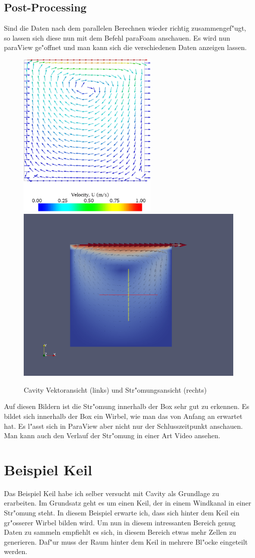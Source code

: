 \begin{refsection}
\subsection{Post-Processing}
Sind die Daten nach dem parallelen Berechnen wieder richtig
zusammengef"ugt, so lassen sich diese nun mit dem Befehl paraFoam
anschauen. Es wird nun paraView ge"offnet und man kann sich die
verschiedenen Daten anzeigen lassen.
\begin{figure}
\begin{center}
\includegraphics[width = 0.31\hsize]{./openfoam/pics/stroemung.png}
\qquad
\includegraphics[width = 0.48\hsize]{./openfoam/pics/stroemung2.png}
\end{center}
\caption{Cavity Vektoransicht (links) und Str"omungsansicht (rechts)
\cite{of}}
\end{figure}

Auf diesen Bildern ist die Str"omung innerhalb der Box sehr gut zu
erkennen. Es bildet sich innerhalb der Box ein Wirbel, wie man das von
Anfang an erwartet hat. Es l"asst sich in ParaView aber nicht nur der
Schlusszeitpunkt anschauen. Man kann auch den Verlauf der Str"omung in
einer Art Video ansehen.

\section{Beispiel Keil}
Das Beispiel Keil habe ich selber versucht mit Cavity als Grundlage zu
erarbeiten. Im Grundsatz geht es um einen Keil, der in einem Windkanal
in einer Str"omung steht. In diesem Beispiel erwarte ich, dass sich
hinter dem Keil ein gr"osserer Wirbel bilden wird. Um nun in diesem
intressanten Bereich genug Daten zu sammeln empfiehlt es sich, in diesem
Bereich etwas mehr Zellen zu generieren. Daf"ur muss der Raum hinter
dem Keil in mehrere Bl"ocke eingeteilt werden.


\end{refsection}
